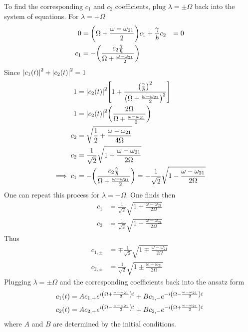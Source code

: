 \documentclass[12pt,a4paper,titlepage]{article}
\begin{document}
To find the corresponding $c_{1}$ and $c_{2}$ coefficients, plug $\lambda=\pm\Omega$ back into the system of equations. For $\lambda=+\Omega$
\begin{equation}
\begin{aligned}
0&=\qty(\Omega+\frac{\omega-\omega_{21}}{2})c_{1}+\frac{\gamma}{\hbar}c_{2}&=0\\
c_{1}&=-\qty(\frac{c_{2}\frac{\gamma}{\hbar}}{\Omega+\frac{\omega-\omega_{21}}{2}})
\end{aligned}
\end{equation}
Since $\abs{c_{1}(t)}^{2}+\abs{c_{2}(t)}^{2}=1$
\begin{equation}
\begin{aligned}
1&=\abs{c_{2}(t)}^{2}\qty[1+\frac{\qty(\frac{\gamma}{\hbar})^{2}}{\qty(\Omega+\frac{\omega-\omega_{21}}{2})^{2}}]\\
1&=\abs{c_{2}(t)}^{2}\qty(\frac{2\Omega}{\Omega+\frac{\omega-\omega_{21}}{2}})\\
c_{2}&=\sqrt{\frac{1}{2}+\frac{\omega-\omega_{21}}{4\Omega}}\\
c_{2}&=\frac{1}{\sqrt{2}}\sqrt{1+\frac{\omega-\omega_{21}}{2\Omega}}\\
\implies c_{1}&=-\qty(\frac{c_{2}\frac{\gamma}{\hbar}}{\Omega+\frac{\omega-\omega_{21}}{2}})=-\frac{1}{\sqrt{2}}\sqrt{1-\frac{\omega-\omega_{21}}{2\Omega}}\\
\end{aligned}
\end{equation}
One can repeat this process for $\lambda=-\Omega$. One finds then
\begin{equation}
\begin{aligned}
c_{1}&=\frac{1}{\sqrt{2}}\sqrt{1+\frac{\omega-\omega_{21}}{2\Omega}}\\
c_{2}&=\frac{1}{\sqrt{2}}\sqrt{1-\frac{\omega-\omega_{21}}{2\Omega}}
\end{aligned}
\end{equation}
Thus
\begin{equation}
\begin{aligned}
c_{1,\pm}&=\mp\frac{1}{\sqrt{2}}\sqrt{1\mp\frac{\omega-\omega_{21}}{2\Omega}}\\
c_{2,\pm}&=\frac{1}{\sqrt{2}}\sqrt{1\pm\frac{\omega-\omega_{21}}{2\Omega}}
\end{aligned}
\end{equation}
Plugging $\lambda=\pm\Omega$ and the corresponding coefficients back into the ansatz form
\begin{equation}
\begin{aligned}
c_{1}(t)&=Ac_{1,+}e^{i\qty(\Omega+\frac{\omega-\omega_{21}}{2})t}+Bc_{1,-}e^{-i\qty(\Omega-\frac{\omega-\omega_{21}}{2})t}\\
c_{2}(t)&=Ac_{2,+}e^{i\qty(\Omega-\frac{\omega-\omega_{21}}{2})t}+Bc_{2,-}e^{-i\qty(\Omega+\frac{\omega-\omega_{21}}{2})t}
\end{aligned}
\end{equation}
where $A$ and $B$ are determined by the initial conditions.\\
\end{document}
